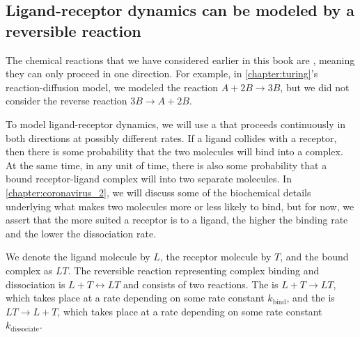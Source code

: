\FloatBarrier
\nopagebreak
{}
\subsection{Ligand-receptor dynamics can be modeled by a reversible reaction}

The chemical reactions that we have considered earlier in this book are , meaning they can only proceed in one direction. For example, in \autoref{chapter:turing}'s reaction-diffusion model, we modeled the reaction $A + 2B \rightarrow 3B$, but we did not consider the reverse reaction $3B \rightarrow A + 2B$.

To model ligand-receptor dynamics, we will use a  that proceeds continuously in both directions at possibly different rates. If a ligand collides with a receptor, then there is some probability that the two molecules will bind into a complex. At the same time, in any unit of time, there is also some probability that a bound receptor-ligand complex will  into two separate molecules. In \autoref{chapter:coronavirus_2}, we will discuss some of the biochemical details underlying what makes two molecules more or less likely to bind, but for now, we assert that the more suited a receptor is to a ligand, the higher the binding rate and the lower the dissociation rate.\\

\begin{note}\end{note}

We denote the ligand molecule by $L$, the receptor molecule by $T$, and the bound complex as $LT$. The reversible reaction representing complex binding and dissociation is $L + T \longleftrightarrow LT$ and consists of two reactions. The  is $L + T \rightarrow LT$, which takes place at a rate depending on some rate constant $k_\text{bind}$, and the  is $LT \rightarrow L + T$, which takes place at a rate depending on some rate constant $k_\text{dissociate}$.

